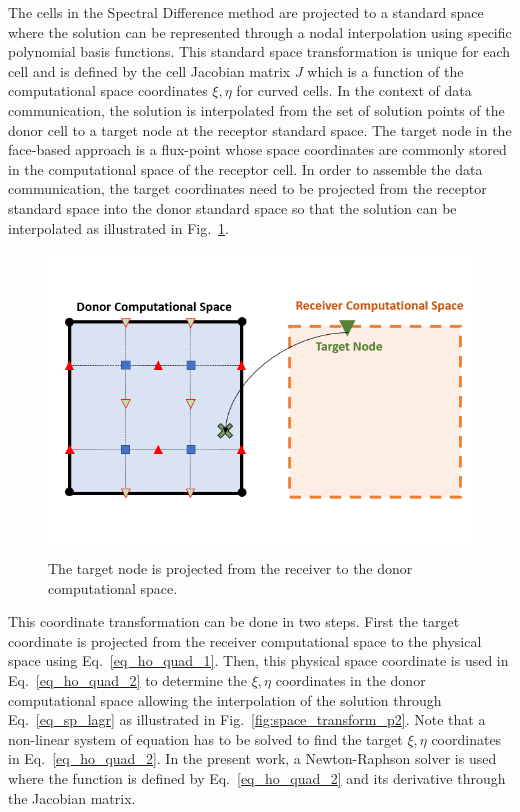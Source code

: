 The cells in the Spectral Difference method are projected to a standard space where the solution can be represented through a nodal interpolation using specific polynomial basis functions. This standard space transformation is unique for each cell and is defined by the cell Jacobian matrix $J$ which is a function of the computational space coordinates $\xi, \eta$ for curved cells. In the context of data communication, the solution is interpolated from the set of solution points of the donor cell to a target node at the receptor standard space. The target node in the face-based approach is a flux-point whose space coordinates are commonly stored in the computational space of the receptor cell. In order to assemble the data communication, the target coordinates need to be projected from the receptor standard space into the donor standard space so that the solution can be interpolated as illustrated in Fig.\ \ref{fig:space_transform_p1}. 
%
\begin{figure}[H]
	\centering
	\includegraphics[height=8.0cm]{figs/overset/space_transformation_p1.png}
    \caption{The target node is projected from the receiver to the donor computational space.}
    \label{fig:space_transform_p1}
\end{figure}
%
This coordinate transformation can be done in two steps. First the target coordinate is projected from the receiver computational space to the physical space using Eq.\ \ref{eq_ho_quad_1}. Then, this physical space coordinate is used in Eq.\ \ref{eq_ho_quad_2} to determine the $\xi, \eta$ coordinates in the donor computational space allowing the interpolation of the solution through Eq.\ \ref{eq_sp_lagr} as illustrated in Fig.\ \ref{fig:space_transform_p2}. Note that a non-linear system of equation has to be solved to find the target $\xi, \eta$ coordinates in Eq.\ \ref{eq_ho_quad_2}. In the present work, a Newton-Raphson solver is used where the function is defined by Eq.\ \ref{eq_ho_quad_2} and its derivative through the Jacobian matrix. 
